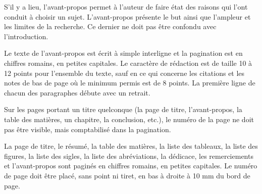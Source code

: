 \begin{preface}

S’il y a lieu, l’avant-propos permet à l’auteur de faire état des raisons qui l’ont conduit à choisir un sujet. L’avant-propos présente le but ainsi que l’ampleur et les limites de la recherche. Ce dernier ne doit pas être confondu avec l’introduction.

Le texte de l’avant-propos est écrit à simple interligne et la pagination est en chiffres romains, en petites capitales. Le caractère de rédaction est de taille 10 à 12 points pour l’ensemble du texte, sauf en ce qui concerne les citations et les notes de bas de page où le minimum permis est de 8 points. La première ligne de chacun des paragraphes débute avec un retrait.

Sur les pages portant un titre quelconque (la page de titre, l’avant-propos, la table des matières, un chapitre, la conclusion, etc.), le numéro de la page ne doit pas être visible, mais comptabilisé dans la pagination.

La page de titre, le résumé, la table des matières, la liste des tableaux, la liste des figures, la liste des sigles, la liste des abréviations, la dédicace, les remerciements et l’avant-propos sont paginés en chiffres romains, en petites capitales. Le numéro de page doit être placé, sans point ni tiret, en bas à droite à 10 mm du bord de page.

\end{preface}
